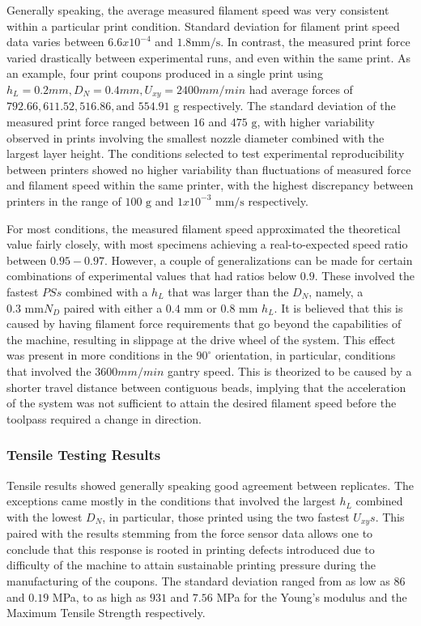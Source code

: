 \documentclass[main.tex]{subfiles}
\begin{document}
Generally speaking, the average measured filament speed was very consistent within a particular print condition. Standard deviation for filament print speed data varies between $6.6x10^{-4}$ and $1.8 \text{mm/s}$. In contrast, the measured print force varied drastically between experimental runs, and even within the same print. As an example, four print coupons produced in a single print using $h_{L}= 0.2 mm, D_{N} = 0.4 mm, U_{xy} = 2400 mm/min$ had average forces of $792.66, 611.52, 516.86, \text{and } 554.91$ g respectively. The standard deviation of the measured print force ranged between $16$ and $475\text{ g}$, with higher variability observed in prints involving the smallest nozzle diameter combined with the largest layer height. The conditions selected to test experimental reproducibility between printers showed no higher variability than fluctuations of measured force and filament speed within the same printer, with the highest discrepancy between printers in the range of $100 \text{ g}$ and $1x10^{-3} \text{ mm/s}$ respectively. 

For most conditions, the measured filament speed approximated the theoretical value fairly closely, with most specimens achieving a real-to-expected speed ratio between $0.95-0.97$. However, a couple of generalizations can be made for certain combinations of experimental values that had ratios below $0.9$. These involved the fastest $PSs$ combined with a $h_{L}$ that was larger than the $D_{N}$, namely, a $0.3 \text{ mm} N_{D}$ paired with either a $0.4 \text{ mm}$ or $0.8 \text{ mm}$ $h_{L}$. It is believed that this is caused by having filament force requirements that go beyond the capabilities of the machine, resulting in slippage at the drive wheel of the system. This effect was present in more conditions in the $90^{\circ}$ orientation, in particular, conditions that involved the $3600 mm/min$ gantry speed. This is theorized to be caused by a shorter travel distance between contiguous beads, implying that the acceleration of the system was not sufficient to attain the desired filament speed before the toolpass required a change in direction. 

\subsubsection{Tensile Testing Results}

Tensile results showed generally speaking good agreement between replicates. The exceptions came mostly in the conditions that involved the largest $h_{L}$ combined with the lowest $D_{N}$, in particular, those printed using the two fastest $U_{xy}s$. This paired with the results stemming from the force sensor data allows one to conclude that this response is rooted in printing defects introduced due to difficulty of the machine to attain sustainable printing pressure during the manufacturing of the coupons. The standard deviation ranged from as low as $86$ and $0.19$ MPa, to as high as $931$ and $7.56$ MPa for the Young's modulus and the Maximum Tensile Strength respectively.
\end{document}
